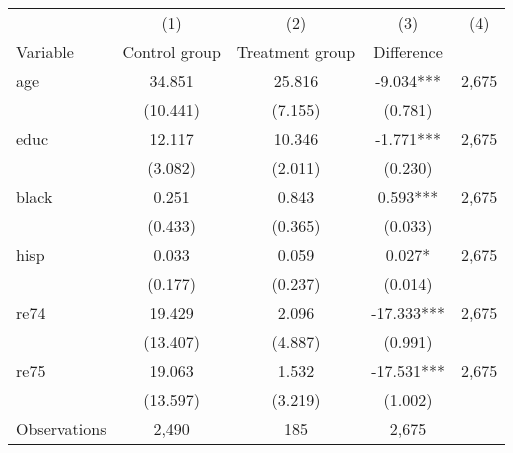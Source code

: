 \begin{tabular}{l*{4}c}
\hline\hline
 & (1) & (2) & (3) & (4) \\
Variable & Control group & Treatment group & Difference &  \\
\hline
age&34.851&25.816&-9.034***&2,675\\
&(10.441)&(7.155)&(0.781)&\\
educ&12.117&10.346&-1.771***&2,675\\
&(3.082)&(2.011)&(0.230)&\\
black&0.251&0.843&0.593***&2,675\\
&(0.433)&(0.365)&(0.033)&\\
hisp&0.033&0.059&0.027*&2,675\\
&(0.177)&(0.237)&(0.014)&\\
re74&19.429&2.096&-17.333***&2,675\\
&(13.407)&(4.887)&(0.991)&\\
re75&19.063&1.532&-17.531***&2,675\\
&(13.597)&(3.219)&(1.002)&\\
\hline
Observations & 2,490 & 185 & 2,675 & \\
\hline\hline
\end{tabular}
